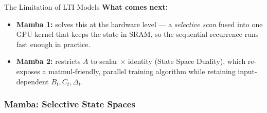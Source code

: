\begin{frame}{The Limitation of LTI Models}
  \textbf{What comes next:}
  \begin{itemize}
    \item \textbf{Mamba 1:} solves this at the hardware level — a \emph{selective scan} fused into one GPU kernel that keeps the state in SRAM, so the sequential recurrence runs fast enough in practice.
    \item \textbf{Mamba 2:} restricts $\bar{A}$ to scalar $\times$ identity (State Space Duality), which re-exposes a matmul-friendly, parallel training algorithm while retaining input-dependent $B_t, C_t, \Delta_t$.
  \end{itemize}
\end{frame}

\subsubsection{Mamba: Selective State Spaces}

